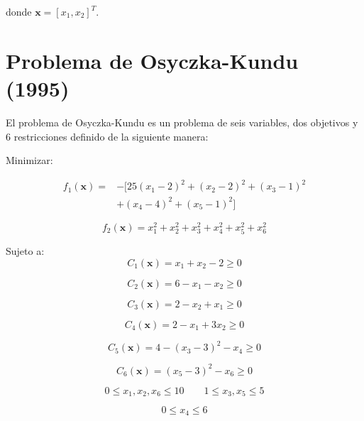\documentclass[conference]{IEEEtran}
\begin{document}
donde $\mathbf{x} = \left[ x_{1}, x_{2} \right]^{T}$.
\section{Problema de Osyczka-Kundu (1995)}
El problema de Osyczka-Kundu es un problema de seis variables, dos objetivos y 6 restricciones definido de la siguiente manera:

Minimizar:

\begin{align*}
f_{1}(\mathbf{x}) = &  -[ 25 ( x_{1} - 2)^{2} + ( x_{2} - 2)^{2} + ( x_{3} - 1)^{2} \\
    &  + ( x_{4} - 4)^{2} + ( x_{5} - 1)^{2} ]
\end{align*}



\begin{equation}
f_{2}(\mathbf{x}) = x_{1}^{2} + x_{2}^{2} + x_{3}^{2} + x_{4}^{2} + x_{5}^{2} + x_{6}^{2}
\end{equation}



Sujeto a:
\begin{equation}
C_{1}(\mathbf{x})  = x_{1} + x_{2} -2 \geq 0
\end{equation}

\begin{equation}
C_{2}(\mathbf{x}) = 6 - x_{1} -x_{2}   \geq 0
\end{equation}

\begin{equation}
C_{3}(\mathbf{x}) = 2 - x_{2}  + x_{1}   \geq 0
\end{equation}

\begin{equation}
C_{4}(\mathbf{x}) = 2 - x_{1}  + 3 x_{2}   \geq 0
\end{equation}

\begin{equation}
C_{5}(\mathbf{x}) = 4 - (x_{3} -3)^{2} -x_{4}  \geq 0
\end{equation}

\begin{equation}
C_{6}(\mathbf{x}) = (x_{5} -3)^{2} -x_{6}  \geq 0
\end{equation}

\begin{equation}
0 \leq x_{1},x_{2},x_{6} \leq 10  \qquad 1 \leq x_{3}, x_{5}  \leq 5 
\end{equation}

\begin{equation}
0 \leq x_{4} \leq 6
\end{equation}
\end{document}
